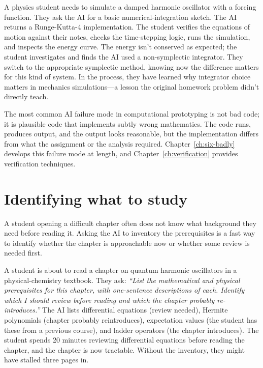 \documentclass[11pt]{book}
\begin{document}
\begin{example}
A physics student needs to simulate a damped harmonic oscillator with a forcing function. They ask the AI for a basic numerical-integration sketch. The AI returns a Runge-Kutta-4 implementation. The student verifies the equations of motion against their notes, checks the time-stepping logic, runs the simulation, and inspects the energy curve. The energy isn't conserved as expected; the student investigates and finds the AI used a non-symplectic integrator. They switch to the appropriate symplectic method, knowing now the difference matters for this kind of system. In the process, they have learned why integrator choice matters in mechanics simulations---a lesson the original homework problem didn't directly teach.
\end{example}

\begin{watchout}
The most common AI failure mode in computational prototyping is not bad code; it is plausible code that implements subtly wrong mathematics. The code runs, produces output, and the output looks reasonable, but the implementation differs from what the assignment or the analysis required. Chapter~\ref{ch:six-badly} develops this failure mode at length, and Chapter~\ref{ch:verification} provides verification techniques.
\end{watchout}

\section{Identifying what to study}

A student opening a difficult chapter often does not know what background they need before reading it. Asking the AI to inventory the prerequisites is a fast way to identify whether the chapter is approachable now or whether some review is needed first.

\begin{example}
A student is about to read a chapter on quantum harmonic oscillators in a physical-chemistry textbook. They ask: \emph{``List the mathematical and physical prerequisites for this chapter, with one-sentence descriptions of each. Identify which I should review before reading and which the chapter probably re-introduces.''} The AI lists differential equations (review needed), Hermite polynomials (chapter probably reintroduces), expectation values (the student has these from a previous course), and ladder operators (the chapter introduces). The student spends 20 minutes reviewing differential equations before reading the chapter, and the chapter is now tractable. Without the inventory, they might have stalled three pages in.
\end{example}
\end{document}
